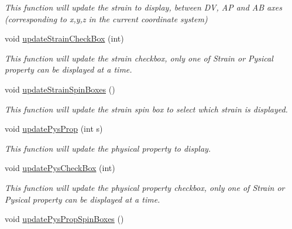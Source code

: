 \begin{DoxyCompactItemize}
\begin{DoxyCompactList}\small\item\em This function will update the strain to display, between D\+V, A\+P and A\+B axes (corresponding to x,y,z in the current coordinate system) \end{DoxyCompactList}\item 
void \hyperlink{classMainWindow_a99a35d2b2c33a4cadab365403816c15c}{update\+Strain\+Check\+Box} (int)
\begin{DoxyCompactList}\small\item\em This function will update the strain checkbox, only one of Strain or Pysical property can be displayed at a time. \end{DoxyCompactList}\item 
\hypertarget{classMainWindow_a3312d7addf449ffda5fd9f68964d6b61}{}void \hyperlink{classMainWindow_a3312d7addf449ffda5fd9f68964d6b61}{update\+Strain\+Spin\+Boxes} ()\label{classMainWindow_a3312d7addf449ffda5fd9f68964d6b61}

\begin{DoxyCompactList}\small\item\em This function will update the strain spin box to select which strain is displayed. \end{DoxyCompactList}\item 
\hypertarget{classMainWindow_a524bf8d075a209be107c5ee9cd750bba}{}void \hyperlink{classMainWindow_a524bf8d075a209be107c5ee9cd750bba}{update\+Pys\+Prop} (int s)\label{classMainWindow_a524bf8d075a209be107c5ee9cd750bba}

\begin{DoxyCompactList}\small\item\em This function will update the physical property to display. \end{DoxyCompactList}\item 
void \hyperlink{classMainWindow_a933538d0ccf6de1298c6e4c7ed223f38}{update\+Pys\+Check\+Box} (int)
\begin{DoxyCompactList}\small\item\em This function will update the physical property checkbox, only one of Strain or Pysical property can be displayed at a time. \end{DoxyCompactList}\item 
\hypertarget{classMainWindow_a3ee88b5e4474675aec3b55f7a5e38bb2}{}void \hyperlink{classMainWindow_a3ee88b5e4474675aec3b55f7a5e38bb2}{update\+Pys\+Prop\+Spin\+Boxes} ()\label{classMainWindow_a3ee88b5e4474675aec3b55f7a5e38bb2}


\end{DoxyCompactItemize}
